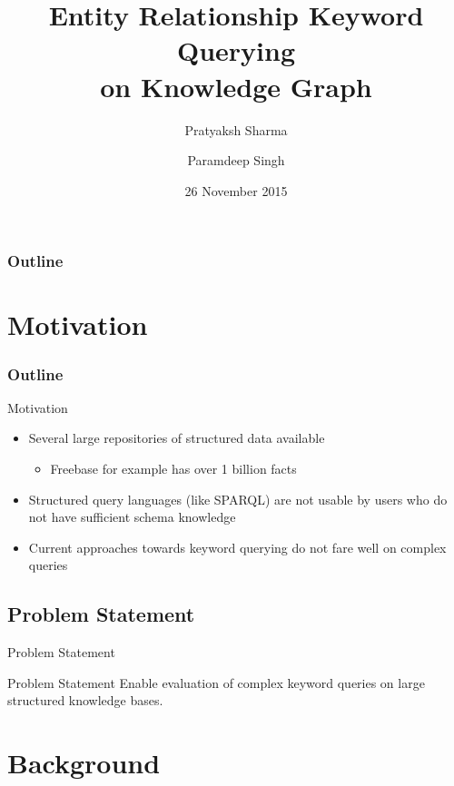 \documentclass[pdf,11pt]{beamer}
\author[Pratyaksh \and Paramdeep]{Pratyaksh Sharma \and Paramdeep Singh}
\title[Keyword Querying]{Entity Relationship Keyword Querying \\ on Knowledge Graph}
\date{26 November 2015}
\begin{document}
\begin{frame}
  \titlepage
\end{frame}

\begin{frame}
  \frametitle{Outline}
    \tableofcontents[hideallsubsections]
\end{frame}

\section{Motivation}
\begin{frame}
  \frametitle{Outline}
\end{frame}


\begin{frame}{Motivation}
\begin{itemize}
\item Several large repositories of structured data available
  \begin{itemize}
  \item Freebase for example has over 1 billion facts
  \end{itemize}
\item Structured query languages (like SPARQL) are not usable by users who do not have sufficient schema knowledge
\item Current approaches towards keyword querying do not fare well on complex queries
\end{itemize}

\end{frame}


\subsection{Problem Statement}
\begin{frame}{Problem Statement}

\begin{block}{Problem Statement}
Enable evaluation of complex keyword queries on large structured knowledge bases.
\end{block}

\end{frame}


\section{Background}
\end{document}

